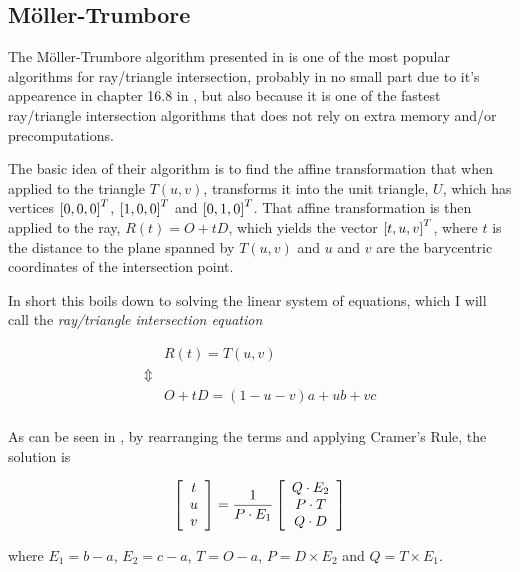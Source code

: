 \subsection{Möller-Trumbore}


The Möller-Trumbore algorithm presented in 
is one of the most popular algorithms for ray/triangle intersection,
probably in no small part due to it's appearence in chapter 16.8 in
, but also because it is one of the fastest
ray/triangle intersection algorithms that does not rely on extra
memory and/or precomputations.


The basic idea of their algorithm is to find the affine transformation
that when applied to the triangle $T(u,v)$, transforms it into the unit
triangle, $U$, which has vertices $\left[0, 0, 0 \right]^T$,
$\left[1, 0, 0 \right]^T$ and $\left[0, 1, 0 \right]^T$. That affine
transformation is then applied to the ray, $R(t) = O + tD$, which
yields the vector $\left[t, u, v \right]^T$, where $t$ is the distance to
the plane spanned by $T(u,v)$ and $u$ and $v$ are the barycentric
coordinates of the intersection point.

In short this boils down to solving the linear system of equations,
which I will call the \textit{ray/triangle intersection equation}

\begin{displaymath}
  \begin{array}{rl}
    & R(t) = T(u,v) \\
    \Updownarrow \\
    & O + tD = (1-u-v)a + ub + vc \\
  \end{array}
\end{displaymath}

As can be seen in , by rearranging the
terms and applying Cramer's Rule, the solution is

\begin{displaymath}
  \left[\begin{array}{c} t \\ u \\ v \end{array}\right] = \frac{1}{P \cdot E_1} 
  \left[\begin{array}{c} Q \cdot E_2 \\ P \cdot T \\ Q \cdot D \end{array}\right]
\end{displaymath}

where $E_1 = b - a$, $E_2 = c - a$, $T = O - a$, $P = D \times  E_2$
and $Q = T \times  E_1$.

